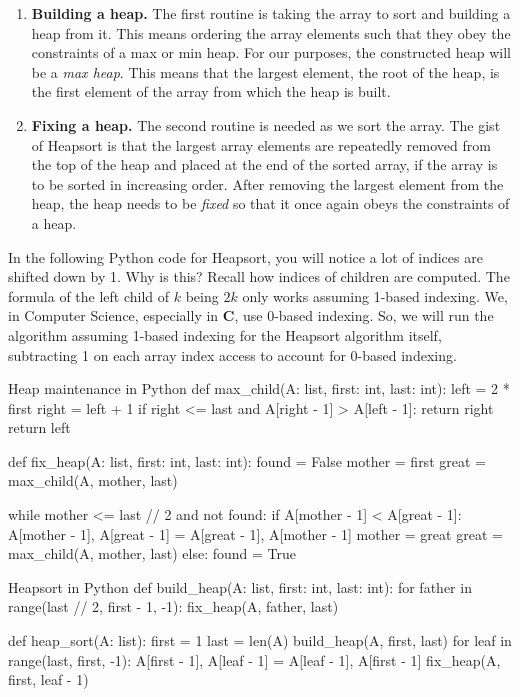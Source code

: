 \begin{enumerate}
  \item \textbf{Building a heap.} The first routine is taking the array
    to sort and building a heap from it. This means ordering the array
    elements such that they obey the constraints of a max or min heap.
    For our purposes, the constructed heap will be a \emph{max heap}.
    This means that the largest element, the root of the heap, is the
    first element of the array from which the heap is built.
  \item \textbf{Fixing a heap.} The second routine is needed as we sort
    the array. The gist of Heapsort is that the largest array elements
    are repeatedly removed from the top of the heap and placed at the
    end of the sorted array, if the array is to be sorted in increasing
    order. After removing the largest element from the heap, the heap
    needs to be \emph{fixed} so that it once again obeys the constraints
    of a heap.
\end{enumerate}

In the following Python code for Heapsort, you will notice a lot of
indices are shifted down by 1. Why is this? Recall how indices of
children are computed. The formula of the left child of $k$ being $2k$
only works assuming 1-based indexing. We, in Computer Science,
especially in \textbf{C}, use 0-based indexing. So, we will run the
algorithm assuming 1-based indexing for the Heapsort algorithm itself,
subtracting 1 on each array index access to account for 0-based
indexing.

\begin{pylisting}{Heap maintenance in Python}
def max_child(A: list, first: int, last: int):
    left = 2 * first
    right = left + 1
    if right <= last and A[right - 1] > A[left - 1]:
        return right
    return left

def fix_heap(A: list, first: int, last: int):
    found = False
    mother = first
    great = max_child(A, mother, last)

    while mother <= last // 2 and not found:
        if A[mother - 1] < A[great - 1]:
            A[mother - 1], A[great - 1] = A[great - 1], A[mother - 1]
            mother = great
            great = max_child(A, mother, last)
        else:
            found = True
\end{pylisting}

\begin{pylisting}{Heapsort in Python}
def build_heap(A: list, first: int, last: int):
    for father in range(last // 2, first - 1, -1):
        fix_heap(A, father, last)

def heap_sort(A: list):
    first = 1
    last = len(A)
    build_heap(A, first, last)
    for leaf in range(last, first, -1):
        A[first - 1], A[leaf - 1] = A[leaf - 1], A[first - 1]
        fix_heap(A, first, leaf - 1)
\end{pylisting}
